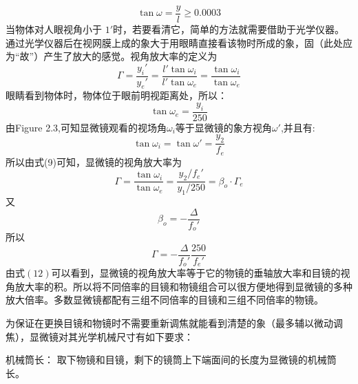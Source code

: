 \documentclass{article}
\begin{document}
\begin{equation}
    \tan \omega =\frac{y}{l} \geq 0.0003
\end{equation}
\hspace*{2em}当物体对人眼视角小于 \(1'\)时，若要看清它，简单的方法就需要借助于光学仪器。通过光学仪器后在视网膜上成的象大于用眼睛直接看该物时所成的象，固（此处应为“故”）产生了放大的感觉。视角放大率的定义为\\
\begin{equation}
    \Gamma=\frac{y_i'}{y_e'}=\frac{l'\tan\omega_i}{l'\tan\omega_e}=\frac{\tan\omega_i}{\tan\omega_e}
\end{equation}
眼睛看到物体时，物体位于眼前明视距离处，所以：
\begin{equation}
    \tan \omega_e=\frac{y_i}{250}
\end{equation}
由Figure 2.3,可知显微镜观看的视场角$\omega_i$等于显微镜的象方视角$\omega'$,并且有:
\begin{equation}
    \tan\omega_i=\tan\omega'=\frac{y_2}{f_e}
\end{equation}
所以由式(9)可知，显微镜的视角放大率为
\begin{equation}
    \Gamma=\frac{\tan\omega_i}{\tan\omega_e}=\frac{y_2/f_e'}{y_1/250}=\beta_o\cdot\Gamma_e
\end{equation}
又
\begin{equation*}
    \beta_o=-\frac{\Delta}{f_o'}
\end{equation*}
所以
\begin{equation}
    \Gamma=-\frac{\Delta}{f_o'}\frac{250}{f_e'}
\end{equation}
\hspace*{2em}由式\((12)\)可以看到，显微镜的视角放大率等于它的物镜的垂轴放大率和目镜的视角放大率的积。所以将不同倍率的目镜和物镜组合可以很方便地得到显微镜的多种放大倍率。多数显微镜都配有三组不同倍率的目镜和三组不同倍率的物镜。

为保证在更换目镜和物镜时不需要重新调焦就能看到清楚的象（最多辅以微动调焦），显微镜对其光学机械尺寸有如下要求：

机械筒长：  取下物镜和目镜，剩下的镜筒上下端面间的长度为显微镜的机械筒长。
\end{document}
